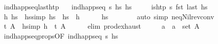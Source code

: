 \begin{isabellebody}
\isanewline
{}\isamarkupfalse%
\ ind{\isacharunderscore}{\kern0pt}happ{\isacharunderscore}{\kern0pt}seq{\isacharunderscore}{\kern0pt}last{\isacharunderscore}{\kern0pt}htp{\isacharcolon}{\kern0pt}\isanewline
\ \ \ {\isachardoublequoteopen}ind{\isacharunderscore}{\kern0pt}happ{\isacharunderscore}{\kern0pt}seq\ {\isasympi}s\ hs{\isachardoublequoteclose}\ {\isachardoublequoteopen}hs\ {\isasymnoteq}\ {\isacharbrackleft}{\kern0pt}{\isacharbrackright}{\kern0pt}{\isachardoublequoteclose}\isanewline
\ \ \ {\isachardoublequoteopen}is{\isacharunderscore}{\kern0pt}htp\ {\isasympi}s\ {\isacharparenleft}{\kern0pt}fst\ {\isacharparenleft}{\kern0pt}last\ hs{\isacharparenright}{\kern0pt}{\isacharparenright}{\kern0pt}{\isachardoublequoteclose}\isanewline
%
\isadelimproof
%
\endisadelimproof
%
\isatagproof
{}\isamarkupfalse%
{\isacharminus}{\kern0pt}\isanewline
\ \ \isamarkupfalse%
\ h\ hs{\isacharprime}{\kern0pt}\ \ hs{\isacharbrackleft}{\kern0pt}simp{\isacharbrackright}{\kern0pt}{\isacharcolon}{\kern0pt}\ {\isachardoublequoteopen}hs\ {\isacharequal}{\kern0pt}\ hs{\isacharprime}{\kern0pt}\ {\isacharat}{\kern0pt}\ {\isacharbrackleft}{\kern0pt}h{\isacharbrackright}{\kern0pt}{\isachardoublequoteclose}\isanewline
\ \ \ \ \isamarkupfalse%
\ {\isacartoucheopen}hs\ {\isasymnoteq}\ {\isacharbrackleft}{\kern0pt}{\isacharbrackright}{\kern0pt}{\isacartoucheclose}\isanewline
\ \ \ \ \isamarkupfalse%
\ {\isacharparenleft}{\kern0pt}auto\ simp{\isacharcolon}{\kern0pt}\ neq{\isacharunderscore}{\kern0pt}Nil{\isacharunderscore}{\kern0pt}rev{\isacharunderscore}{\kern0pt}conv{\isacharparenright}{\kern0pt}\isanewline
\ \ \isamarkupfalse%
\ \isamarkupfalse%
\ t\ A\ \ h{\isacharbrackleft}{\kern0pt}simp{\isacharbrackright}{\kern0pt}{\isacharcolon}{\kern0pt}\ {\isachardoublequoteopen}h\ {\isacharequal}{\kern0pt}\ {\isacharparenleft}{\kern0pt}t{\isacharcomma}{\kern0pt}\ A{\isacharparenright}{\kern0pt}{\isachardoublequoteclose}\isanewline
\ \ \ \ \isamarkupfalse%
\ {\isacharparenleft}{\kern0pt}elim\ prod{\isachardot}{\kern0pt}exhaust{\isacharparenright}{\kern0pt}\isanewline
\ \ \isamarkupfalse%
\ \isamarkupfalse%
\ a\ \ {\isachardoublequoteopen}a\ {\isasymin}\ set\ A{\isachardoublequoteclose}\isanewline
\ \ \ \ \isamarkupfalse%
\ ind{\isacharunderscore}{\kern0pt}happ{\isacharunderscore}{\kern0pt}seq{\isacharunderscore}{\kern0pt}props{\isacharparenleft}{\kern0pt}{}{\isacharparenright}{\kern0pt}{\isacharbrackleft}{\kern0pt}OF\ {\isacartoucheopen}ind{\isacharunderscore}{\kern0pt}happ{\isacharunderscore}{\kern0pt}seq\ {\isasympi}s\ hs{\isacartoucheclose}{\isacharbrackright}{\kern0pt}\isanewline

\end{isabellebody}
